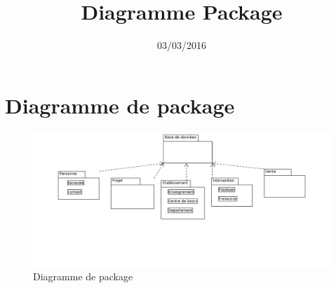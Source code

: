 \documentclass[asi, sansVersion]{picInsa}
\begin{document}
\title{Diagramme Package}
\author{\Melissa}
\date{03/03/2016} 

\maketitle

\tableofcontents

\chapter{Diagramme de package}

\begin{figure}
	\centering
	\includegraphics[scale=0.5]{images/diagrammePackage.png}
	\caption{\label{modele}Diagramme de package}
\end{figure}
\end{document}

